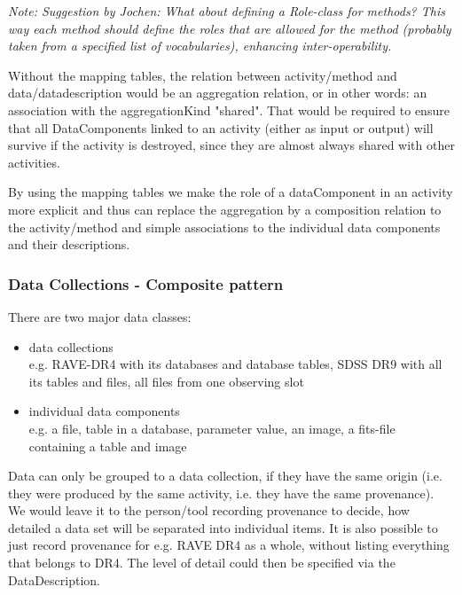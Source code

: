 \documentclass[11pt,a4paper]{ivoa}
\begin{document}
\emph{Note: Suggestion by Jochen: What about defining a Role-class for methods? This way each method should define the roles that are allowed for the method (probably taken from a specified list of vocabularies), enhancing inter-operability.}

Without the mapping tables, the relation between activity/method and data/datadescription would be an aggregation relation, or in other words: an association with the aggregationKind "shared". That would be required to ensure that all DataComponents linked to an activity (either as input or output) will survive if the activity is destroyed, since they are almost always shared with other activities. 

By using the mapping tables we make the role of a dataComponent in an activity more explicit and thus can replace the aggregation by a composition relation to the activity/method and simple associations to the individual data components and their descriptions. 


\subsubsection{Data Collections - Composite pattern}

There are two major data classes: 

\begin{itemize} 
\item data collections \\e.g. RAVE-DR4 with its databases and database tables, SDSS DR9 with 
all its tables and files, all files from one observing slot\\

\item individual data components\\
e.g. a file, table in a database, parameter value, an image, a fits-file containing a table and image

\end{itemize}


Data can only be grouped to a data collection, if they have the same origin (i.e. they were
produced by the same activity, i.e. they have the same provenance).
We would leave it to the person/tool recording provenance to decide, how detailed a data set will be  
separated into individual items. It is also possible to just record provenance for e.g. RAVE DR4 as a 
whole, without listing everything that belongs to DR4. The level of detail could then be specified via 
the DataDescription.
\end{document}

